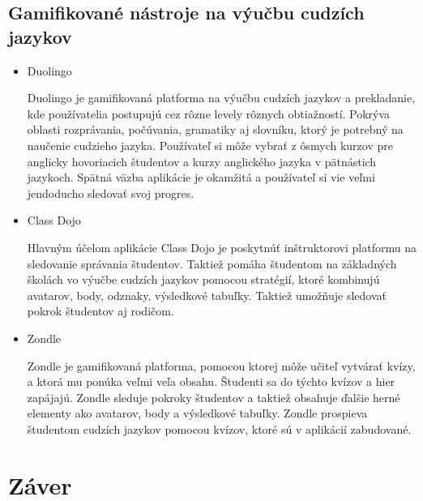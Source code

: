 \documentclass[10pt,oneside,slovak,a4paper]{article}
\begin{document}
\subsection{Gamifikované nástroje na výučbu cudzích jazykov}
\begin{itemize}
\item Duolingo

Duolingo je gamifikovaná platforma na výučbu cudzích jazykov a prekladanie, kde používatelia postupujú cez rôzne levely rôznych obtiažností. Pokrýva oblasti rozprávania, počúvania, gramatiky aj slovníku, ktorý je potrebný na naučenie cudzieho jazyka. Používateľ si môže vybrať z ôsmych kurzov pre anglicky hovoriacich študentov a kurzy anglického jazyka v pätnástich jazykoch. Spätná väzba aplikácie je okamžitá a používateľ si vie veľmi jendoducho sledovať svoj progres.

\item Class Dojo

Hlavným účelom aplikácie Class Dojo je poskytnúť inštruktorovi platformu na sledovanie správania študentov. Taktiež pomáha študentom na základných školách vo výučbe cudzích jazykov pomocou stratégií, ktoré kombinujú avatarov, body, odznaky, výsledkové tabuľky. Taktiež umožňuje sledovať pokrok študentov aj rodičom. 

\item Zondle

Zondle je gamifikovaná platforma, pomocou ktorej môže učiteľ vytvárať kvízy, a ktorá mu ponúka veľmi veľa obsahu. Študenti sa do týchto kvízov a hier zapájajú. Zondle sleduje pokroky študentov a taktiež obsahuje ďalšie herné elementy ako avatarov, body a výsledkové tabuľky. Zondle prospieva študentom cudzích jazykov pomocou kvízov, ktoré sú v aplikácií zabudované. 
\end{itemize}
    

\label{tools}



\section{Záver} \label{zaver}


\end{document}
